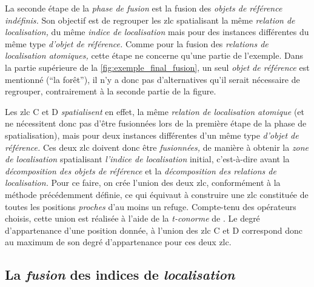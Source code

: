 La seconde étape de la \emph{phase de fusion} est la fusion des
\emph{objets de référence indéfinis.} Son objectif est de regrouper
les \ac{zlc} spatialisant la même \emph{relation de localisation,} du
même \emph{indice de localisation} mais pour des instances différentes
du même type \emph{d'objet de référence.} Comme pour la fusion des
\emph{relations de localisation atomiques,} cette étape ne concerne
qu'une partie de l'exemple. Dans la partie supérieure de la
\autoref{fig:exemple_final_fusion}, un seul \emph{objet de référence}
est mentionné (\enquote{la forêt}), il n'y a donc pas d'alternatives
qu'il serait nécessaire de regrouper, contrairement à la seconde
partie de la figure.

Les \ac{zlc} \textcolor{RdBu-9-8}{\textsf{C}} et
\textcolor{RdBu-9-9}{\textsf{D}} \emph{spatialisent} en effet, la même
\emph{relation de localisation atomique} (et ne nécessitent donc pas
d'être fusionnées lors de la première étape de la phase de
spatialisation), mais pour deux instances différentes d'un même type
\emph{d'objet de référence.} Ces deux \ac{zlc} doivent donc être
\emph{fusionnées,} de manière à obtenir la \emph{zone de localisation}
spatialisant \emph{l'indice de localisation} initial, c'est-à-dire
avant la \emph{décomposition des objets de référence} et la
\emph{décomposition des relations de localisation.} Pour ce faire, on
crée l'union des deux \ac{zlc}, conformément à la méthode précédemment
définie, ce qui équivaut à construire une \ac{zlc} constituée de
toutes les positions \emph{proches} d'au moins un refuge. Compte-tenu
des opérateurs choisis, cette union est réalisée à l'aide de la
\emph{t-conorme} de \textcite{Zadeh1965}. Le degré d’appartenance
d'une position donnée, à l'union des \ac{zlc}
\textcolor{RdBu-9-8}{\textsf{C}} et \textcolor{RdBu-9-9}{\textsf{D}}
correspond donc au maximum de son degré d'appartenance pour ces deux
\ac{zlc}.

\subsection{La \emph{fusion} des indices de \emph{localisation}}

